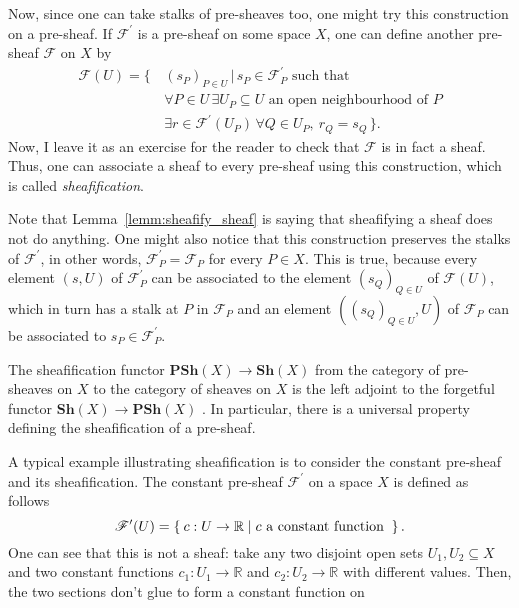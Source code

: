 Now, since one can take stalks of pre-sheaves too, one might try this
construction on a pre-sheaf. If $\mathscr{F}^{\prime}$ is a pre-sheaf
on some space $X$, one can define another pre-sheaf $\mathscr{F}$
on $X$ by
\begin{align*}
  \mathscr{F}(U)=\big\{\,
  & (s_{P})_{P\in U}\,\big\vert\, s_{P}\in\mathscr{F}_{P}^{\prime}
    \text{ such that} \\
  & \forall P\in U\,
    \exists U_{P}\subseteq U\text{ an open neighbourhood of }P \\
  & \exists r\in\mathscr{F}^{\prime}(U_{P})\,\forall Q\in U_{P},
    \ r_{Q}=s_{Q}\,\big\}.
\end{align*}
Now, I leave it as an exercise for the reader to check that
$\mathscr{F}$ is in fact a sheaf. Thus, one can
associate a sheaf to every pre-sheaf using this construction, which is
called \emph{sheafification}.
\begin{rem}
  Note that Lemma~\ref{lemm:sheafify_sheaf} is saying that sheafifying a sheaf does 
  not do anything. One might also notice that this construction preserves 
  the stalks of $\mathscr{F}^{\prime}$, in other words, 
  $\mathscr{F}^{\prime}_{P}=\mathscr{F}_{P}$ for every $P\in X$. 
  This is true, because every element $(s, U)$ of $\mathscr{F}^{\prime}_{P}$ 
  can be associated to the element $(s_{Q})_{Q\in U}$ of $\mathscr{F}(U)$, 
  which in turn has a stalk at $P$ in $\mathscr{F}_{P}$ and an element 
  $((s_{Q})_{Q\in U},U)$ of $\mathscr{F}_{P}$ can be associated to 
  $s_{P}\in \mathscr{F}^{\prime}_{P}$.
\end{rem}
\begin{cat}
  The sheafification functor $\mathbf{PSh}(X)\to\mathbf{Sh}(X)$
  from the category of pre-sheaves on $X$ to the category of sheaves on $X$
  is the left adjoint to the forgetful functor $\mathbf{Sh}(X)\to
  \mathbf{PSh}(X)$ \cite{vakil}.
  In particular, there is a universal property defining the sheafification of a pre-sheaf.
\end{cat}
A typical example illustrating sheafification is to consider the constant
pre-sheaf and its sheafification. The constant pre-sheaf
$\mathscr{F}^{\prime}$ on a space $X$ is defined as follows
\[
  \mathscr{F}^{\prime}(U) =\Set{c: U\to\mathbb{R}\mid c
    \text{ a constant function }}.
\]
One can see that this is not a sheaf: take any two disjoint open sets
$U_{1}, U_{2}\subseteq X$ and two constant functions $c_{1}:U_{1}\to
\mathbb{R}$ and $c_{2}:U_{2}\to\mathbb{R}$ with different values.
Then, the two sections don't glue to form a constant function on
